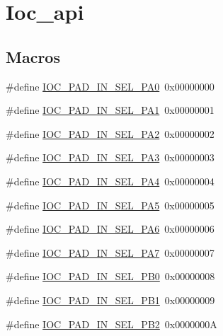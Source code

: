 \hypertarget{group__ioc__api}{}\section{Ioc\+\_\+api}
\label{group__ioc__api}
\subsection*{Macros}
\begin{DoxyCompactItemize}
\item 
\#define \hyperlink{group__ioc__api_ga12b83b520d01e6ae706217908e48b13e}{I\+O\+C\+\_\+\+P\+A\+D\+\_\+\+I\+N\+\_\+\+S\+E\+L\+\_\+\+P\+A0}~0x00000000
\item 
\#define \hyperlink{group__ioc__api_gadd8921f12453d76c8af1d20309dd5278}{I\+O\+C\+\_\+\+P\+A\+D\+\_\+\+I\+N\+\_\+\+S\+E\+L\+\_\+\+P\+A1}~0x00000001
\item 
\#define \hyperlink{group__ioc__api_gae44ae49ef5ad0dbd6bab9c66cedb4bd1}{I\+O\+C\+\_\+\+P\+A\+D\+\_\+\+I\+N\+\_\+\+S\+E\+L\+\_\+\+P\+A2}~0x00000002
\item 
\#define \hyperlink{group__ioc__api_gad6dc604dd603db11019f71ffb0672147}{I\+O\+C\+\_\+\+P\+A\+D\+\_\+\+I\+N\+\_\+\+S\+E\+L\+\_\+\+P\+A3}~0x00000003
\item 
\#define \hyperlink{group__ioc__api_ga34c3712caea44cdc645d4857688fc72c}{I\+O\+C\+\_\+\+P\+A\+D\+\_\+\+I\+N\+\_\+\+S\+E\+L\+\_\+\+P\+A4}~0x00000004
\item 
\#define \hyperlink{group__ioc__api_ga9cded8b488e858617fef82e9d0d434eb}{I\+O\+C\+\_\+\+P\+A\+D\+\_\+\+I\+N\+\_\+\+S\+E\+L\+\_\+\+P\+A5}~0x00000005
\item 
\#define \hyperlink{group__ioc__api_ga8247866d92f87bc990dc2c2cd337f2d7}{I\+O\+C\+\_\+\+P\+A\+D\+\_\+\+I\+N\+\_\+\+S\+E\+L\+\_\+\+P\+A6}~0x00000006
\item 
\#define \hyperlink{group__ioc__api_gae34cb0f278f10c14cac791068d2827fc}{I\+O\+C\+\_\+\+P\+A\+D\+\_\+\+I\+N\+\_\+\+S\+E\+L\+\_\+\+P\+A7}~0x00000007
\item 
\#define \hyperlink{group__ioc__api_ga761489be970351c35f64d5016a94c32a}{I\+O\+C\+\_\+\+P\+A\+D\+\_\+\+I\+N\+\_\+\+S\+E\+L\+\_\+\+P\+B0}~0x00000008
\item 
\#define \hyperlink{group__ioc__api_gadd0d0da3843b1c6e42b69304bbf52e54}{I\+O\+C\+\_\+\+P\+A\+D\+\_\+\+I\+N\+\_\+\+S\+E\+L\+\_\+\+P\+B1}~0x00000009
\item 
\#define \hyperlink{group__ioc__api_ga059453f4479663b05984d8cdf4c1e2b8}{I\+O\+C\+\_\+\+P\+A\+D\+\_\+\+I\+N\+\_\+\+S\+E\+L\+\_\+\+P\+B2}~0x0000000A

\end{DoxyCompactItemize}
